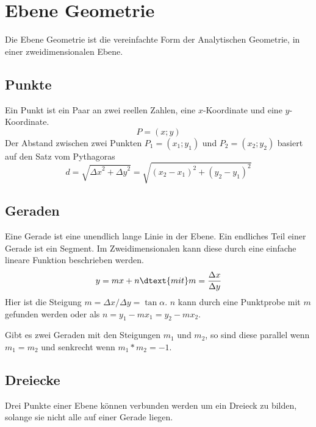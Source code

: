 \documentclass{article}
\begin{document}
\section{Ebene Geometrie} 
Die Ebene Geometrie ist die vereinfachte Form der Analytischen Geometrie, in einer zweidimensionalen Ebene.

\subsection{Punkte}
Ein Punkt ist ein Paar an zwei reellen Zahlen, eine $x$-Koordinate und eine $y$-Koordinate.
\[
 P = (x;y)
\]
Der Abstand zwischen zwei Punkten $P_1 = (x_1;y_1)$ und $P_2 = (x_2;y_2)$ basiert auf den Satz vom Pythagoras
\[
 d = \sqrt{{\Delta x}^2 + {\Delta y}^2} = \sqrt{(x_2-x_1)^2 + (y_2-y_1)^2}
\]

\subsection{Geraden}
Eine Gerade ist eine unendlich lange Linie in der Ebene. Ein endliches Teil einer Gerade ist ein Segment. Im Zweidimensionalen kann diese durch eine einfache lineare Funktion beschrieben werden.
\[
 y = mx+n \dtext{mit} m = \frac{\Delta x}{\Delta y}
\]
Hier ist die Steigung $m=\Delta x / \Delta y=\tan{\alpha}$. $n$ kann durch eine Punktprobe mit $m$ gefunden werden oder als $n = y_1-mx_1 = y_2-mx_2$.

Gibt es zwei Geraden mit den Steigungen $m_1$ und $m_2$, so sind diese parallel wenn $m_1=m_2$ und senkrecht wenn $m_1*m_2=-1$.

\subsection{Dreiecke}
Drei Punkte einer Ebene können verbunden werden um ein Dreieck zu bilden, solange sie nicht alle auf einer Gerade liegen.
\end{document}
